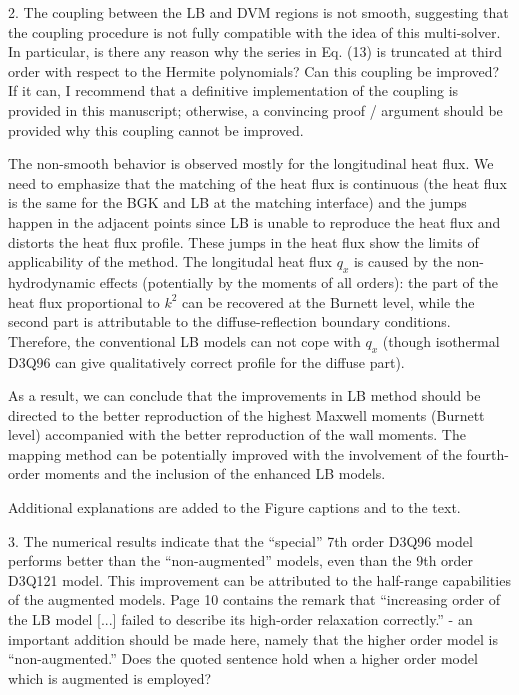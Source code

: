 \documentclass{article}
\begin{document}
\begin{quoting}
    2. The coupling between the LB and DVM regions is not
    smooth, suggesting that the coupling procedure is not
    fully compatible with the idea of this multi-solver.
    In particular, is there any reason why the series in
    Eq. (13) is truncated at third order with respect to
    the Hermite polynomials? Can this coupling be improved?
    If it can, I recommend that a definitive implementation
    of the coupling is provided in this manuscript; otherwise,
    a convincing proof / argument should be provided why this
    coupling cannot be improved.
\end{quoting}

The non-smooth behavior is observed mostly for the longitudinal heat flux.
We need to emphasize that the matching of the heat flux is continuous
(the heat flux is the same for the BGK and LB at the matching interface)
and the jumps happen in the adjacent points
since LB is unable to reproduce the heat flux and distorts the heat flux profile.
These jumps in the heat flux show the limits of applicability of the method.
The longitudal heat flux $q_x$ is caused by the non-hydrodynamic effects
(potentially by the moments of all orders):
the part of the heat flux proportional to $k^2$ can be recovered at the Burnett level,
while the second part is attributable to the diffuse-reflection boundary conditions.
Therefore, the conventional LB models can not cope with $q_x$
(though isothermal D3Q96 can give qualitatively correct profile for the diffuse part).

As a result, we can conclude that the improvements in LB method should be directed
to the better reproduction of the highest Maxwell moments (Burnett level)
accompanied with the better reproduction of the wall moments.
The mapping method can be potentially improved with the involvement of the fourth-order moments
and the inclusion of the enhanced LB models.

Additional explanations are added to the Figure captions and to the text.

\begin{leftbar}
\end{leftbar}

\begin{quoting}
    3. The numerical results indicate that the ``special''
    7th order D3Q96 model performs better than the
    ``non-augmented'' models, even than the 9th order
    D3Q121 model. This improvement can be attributed to
    the half-range capabilities of the augmented models.
    Page 10 contains the remark that ``increasing order of
    the LB model [...] failed to describe its high-order
    relaxation correctly.'' - an important addition should
    be made here, namely that the higher order model is
    ``non-augmented.'' Does the quoted sentence hold when
    a higher order model which is augmented is employed?
\end{quoting}
\end{document}

